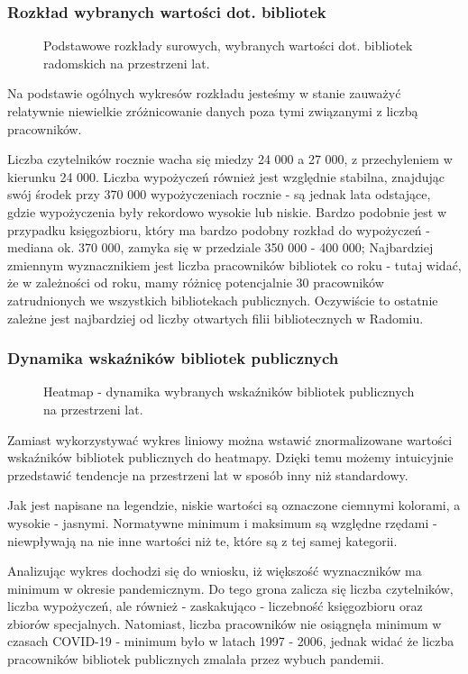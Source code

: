 \documentclass[12pt]{article}
\begin{document}
\subsubsection{Rozkład wybranych wartości dot. bibliotek}
\begin{figure}[H]
    
    \caption{Podstawowe rozkłady surowych, wybranych wartości dot. bibliotek radomskich na przestrzeni lat.}
\end{figure}

Na podstawie ogólnych wykresów rozkładu jesteśmy w stanie zauważyć relatywnie niewielkie zróżnicowanie danych poza tymi związanymi 
z liczbą pracowników. 

Liczba czytelników rocznie wacha się miedzy 24 000 a 27 000, z przechyleniem w kierunku 24 000. 
Liczba wypożyczeń również jest względnie stabilna, znajdując swój środek przy 370 000 wypożyczeniach rocznie - są jednak lata odstające, 
gdzie wypożyczenia były rekordowo wysokie lub niskie. Bardzo podobnie jest w przypadku księgozbioru, który ma bardzo podobny rozkład
do wypożyczeń - mediana ok. 370 000, zamyka się w przedziale 350 000 - 400 000; Najbardziej zmiennym wyznacznikiem jest liczba 
pracowników bibliotek co roku - tutaj widać, że w zależności od roku, mamy różnicę potencjalnie 30 pracowników zatrudnionych we wszystkich
bibliotekach publicznych. Oczywiście to ostatnie zależne jest najbardziej od liczby otwartych filii bibliotecznych w Radomiu. 


\subsubsection{Dynamika wskaźników bibliotek publicznych}
\begin{figure}[H]
    
    \caption{Heatmap - dynamika wybranych wskaźników bibliotek publicznych na przestrzeni lat.}
\end{figure}

Zamiast wykorzystywać wykres liniowy można wstawić znormalizowane wartości wskaźników bibliotek publicznych do heatmapy.
Dzięki temu możemy intuicyjnie przedstawić tendencje na przestrzeni lat w sposób inny niż standardowy. 

Jak jest napisane na legendzie, niskie wartości są oznaczone ciemnymi kolorami, a wysokie - jasnymi. Normatywne minimum i maksimum 
są względne rzędami - niewpływają na nie inne wartości niż te, które są z tej samej kategorii. 

Analizując wykres dochodzi się do wniosku, iż większość wyznaczników ma minimum w okresie pandemicznym. Do tego grona zalicza się 
liczba czytelników, liczba wypożyczeń, ale również - zaskakująco - liczebność księgozbioru oraz zbiorów specjalnych. Natomiast, 
liczba pracowników nie osiągnęła minimum w czasach COVID-19 - minimum było w latach 1997 - 2006, jednak widać że liczba pracowników 
bibliotek publicznych zmalała przez wybuch pandemii.
\end{document}
